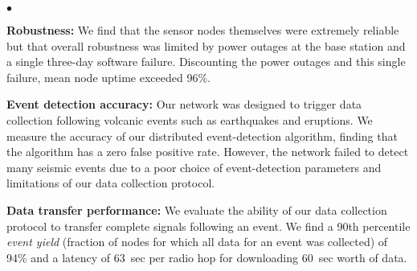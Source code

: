 \begin{list}{$\bullet$}{\setlength{\topsep}{0.05in}
                        \setlength{\leftmargin}{0.15in}
                        \setlength{\itemsep}{0.05in}}

\item 
{\bf Robustness:} We find that the sensor nodes
themselves were extremely reliable but that overall robustness 
was limited by power outages at the base station and a single 
three-day software failure. Discounting the power outages
and this single failure, mean node uptime exceeded 96\%.
%
%
\item 
{\bf Event detection accuracy:} Our network was designed to 
trigger data collection following volcanic events such as 
earthquakes and eruptions. We measure the accuracy of our
distributed event-detection algorithm, finding that the 
algorithm has a zero false positive rate. However, the network
failed to detect many seismic events due to a poor choice of 
event-detection parameters and limitations of our data collection
protocol.
%
%
%
\item 
{\bf Data transfer performance:} We evaluate the ability of our
data collection protocol to transfer complete signals following an 
event. We find a 90th percentile {\em event yield} (fraction of nodes for
which all data for an event was collected) of 94\% and a latency 
of 63~sec per radio hop for downloading 60~sec worth of data.


\end{list}
